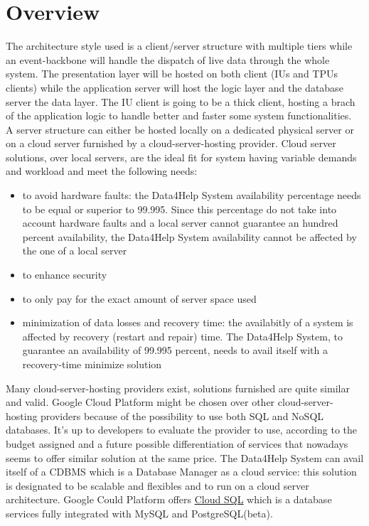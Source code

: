 \section{Overview}
The architecture style used is a client/server structure with multiple tiers while an event-backbone will handle the dispatch of live data through the whole system. The presentation layer will be hosted on both client (IUs and TPUs clients) while the application server will host the logic layer and the database server the data layer. The IU client is going to be a thick client, hosting a brach of the application logic to handle better and faster some system functionalities. \\ 
A server structure can either be hosted locally on a dedicated physical server or on a cloud server furnished by a cloud-server-hosting provider.
Cloud server solutions, over local servers, are the ideal fit for system having variable demands and workload and meet the following needs:
\begin{itemize}
\item to avoid hardware faults: the Data4Help System availability percentage needs to be equal or superior to 99.995. Since this percentage do not take into account hardware faults and a local server cannot guarantee an hundred percent availability, the Data4Help System availability cannot be affected by the one of a local server
\item to enhance security
\item to only pay for the exact amount of server space used
\item minimization of data losses and recovery time: the availabitly of a system is affected by recovery (restart and repair) time. The Data4Help System, to guarantee an availability of 99.995 percent, needs to avail itself with a recovery-time minimize solution
\end{itemize} 
Many cloud-server-hosting providers exist, solutions furnished are quite similar and valid.
Google Cloud Platform might be chosen over other cloud-server-hosting providers because of the possibility to use both SQL and NoSQL databases. It’s up to developers to evaluate the provider to use, according to the budget assigned and a future possible differentiation of services that nowadays seems to offer similar solution at the same price. The
Data4Help System can avail itself of a CDBMS which is a Database Manager as a cloud service: this solution is designated to be scalable and flexibles and to run on a cloud server architecture. Google Could Platform offers \href{https://cloud.google.com/sql/}{\underline{Cloud SQL}} which is a database services fully integrated with MySQL and PostgreSQL(beta). 
\clearpage 
